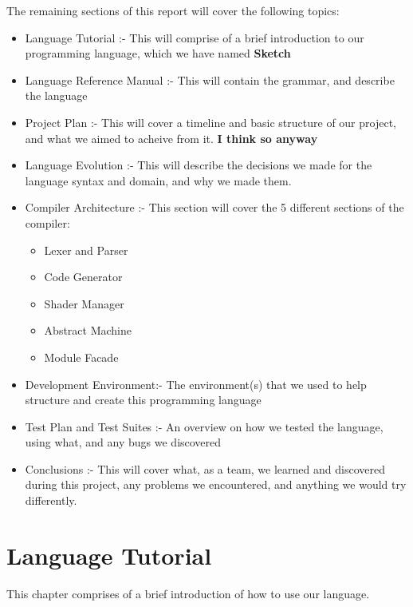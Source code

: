 \documentclass{l3proj}
\begin{document}
The remaining sections of this report will cover the following topics:
\begin{itemize}
	\item Language Tutorial :- This will comprise of a brief introduction to our programming language, which we have named \textbf{Sketch}
	\item Language Reference Manual :- This will contain the grammar, and describe the language
	\item Project Plan :- This will cover a timeline and basic structure of our project, and what we aimed to acheive from it. \textbf{I think so anyway}
	\item Language Evolution :- This will describe the decisions we made for the language syntax and domain, and why we made them.
	\item Compiler Architecture :- This section will cover the 5 different sections of the compiler:
	\begin{itemize}
		\item Lexer and Parser
		\item Code Generator
		\item Shader Manager
		\item Abstract Machine
		\item Module Facade
	\end{itemize}
	\item Development Environment:- The environment(s) that we used to help structure and create this programming language
	\item Test Plan and Test Suites :- An overview on how we tested the language, using what, and any bugs we discovered
	\item Conclusions :- This will cover what, as a team, we learned and discovered during this project, any problems we encountered, and anything we would try differently.
\end{itemize}

\chapter{Language Tutorial}
\label{tut}
This chapter comprises of a brief introduction of how to use our language.
\end{document}
